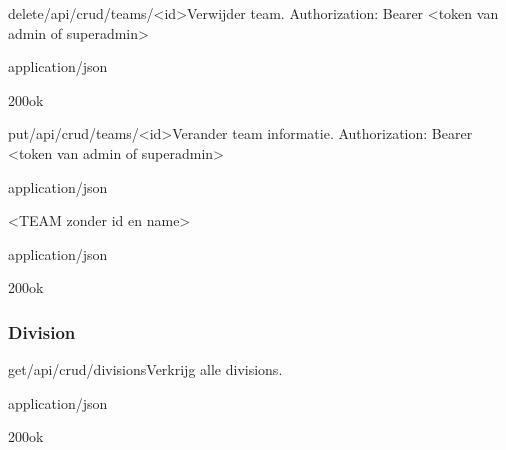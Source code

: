 \documentclass[10pt]{article}
\begin{document}
\begin{apiRoute}{delete}{/api/crud/teams/<id>}{Verwijder team.}
 Authorization: Bearer <token van admin of superadmin>
	\begin{routeParameter}
	\end{routeParameter}

	\begin{routeResponse}{application/json}
		\begin{routeResponseItem}{200}{ok}
			\begin{routeResponseItemBody}
			\end{routeResponseItemBody}
		\end{routeResponseItem}
	\end{routeResponse}
\end{apiRoute}


\begin{apiRoute}{put}{/api/crud/teams/<id>}{Verander team informatie.}
 Authorization: Bearer <token van admin of superadmin>
	\begin{routeParameter}
		\routeParamItem{id}{team id}
	\end{routeParameter}

	\begin{routeRequest}{application/json}
		\begin{routeRequestBody}
<TEAM zonder id en name>
		\end{routeRequestBody}
	\end{routeRequest}

	\begin{routeResponse}{application/json}
		\begin{routeResponseItem}{200}{ok}
			\begin{routeResponseItemBody}
			\end{routeResponseItemBody}
		\end{routeResponseItem}
	\end{routeResponse}
\end{apiRoute}

\subsubsection{Division}

\begin{apiRoute}{get}{/api/crud/divisions}{Verkrijg alle divisions.}
	\begin{routeResponse}{application/json}
		\begin{routeResponseItem}{200}{ok}
			\begin{routeResponseItemBody}
[
	<DIVISION>, ...
]
\end{routeResponseItemBody}
		\end{routeResponseItem}
	\end{routeResponse}
\end{apiRoute}
\end{document}
